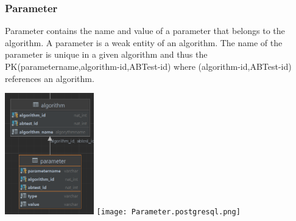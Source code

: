 \documentclass[a4paper,12pt]{article}
\begin{document}
	\subsubsection{Parameter} Parameter contains the name and value of a parameter that belongs to the algorithm. A parameter is a weak entity of an algorithm. The name of the parameter is unique in a given algorithm and thus the PK(parametername,algorithm-id,ABTest-id) where (algorithm-id,ABTest-id) references an algorithm.
\begin{center}
		\includegraphics[height={200px},width=\textwidth,keepaspectratio]{Parameter.png}
		\texttt{[image: Parameter.postgresql.png]}
		
\end{center}
\end{document}
